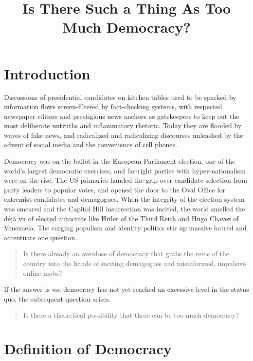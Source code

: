 \documentclass{scrartcl}
\theoremstyle{definition}
\begin{document}
\title{Is There Such a Thing As Too Much Democracy?}
\author{}
\date{}
\maketitle

\section{Introduction}

Discussions of presidential candidates on kitchen tables used to be sparked by information flows screen-filtered by fact-checking systems, with respected newspaper editors and prestigious news anchors as gatekeepers to keep out the most deliberate untruths and inflammatory rhetoric. Today they are flooded by waves of fake news, and radicalized and radicalizing discourses unleashed by the advent of social media and the convenience of cell phones. 

Democracy was on the ballot in the European Parliament election, one of the world’s largest democratic exercises, and far-right parties with hyper-nationalism were on the rise. The US primaries handed the grip over candidate selection from party leaders to popular votes, and opened the door to the Oval Office for extremist candidates and demagogues. When the integrity of the election system was smeared and the Capitol Hill insurrection was incited, the world smelled the déjà vu of elected autocrats like Hitler of the Third Reich and Hugo Chavez of Venezuela. The surging populism and identity politics stir up massive hatred and accentuate one question. 

\begin{quote}
Is there already an overdose of democracy that grabs the reins of the country into the hands of inciting demagogues and misinformed, impulsive online mobs? 
\end{quote}

If the answer is \emph{no}, democracy has not yet reached an excessive level in the status quo, the subsequent question arises.

\begin{quote}
Is there a theoretical possibility that there can be too much democracy? 
\end{quote}

\section{Definition of Democracy}
\end{document}
